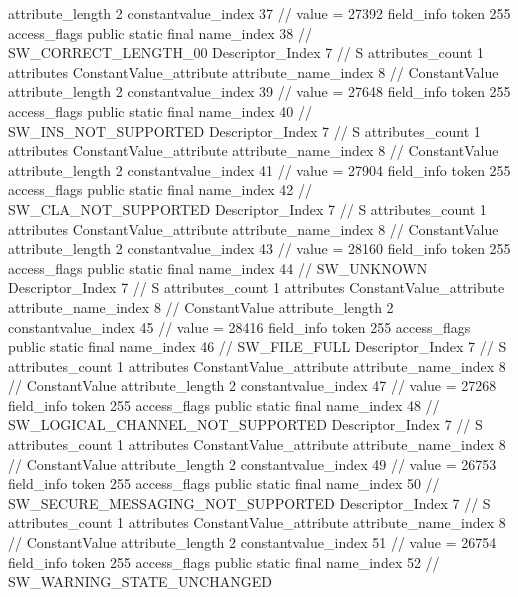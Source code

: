 {{{{{{{					attribute_length	2
					constantvalue_index	37		// value = 27392
				}
				}
			}
			field_info {
				token	255
				access_flags	public static final
				name_index	38		// SW_CORRECT_LENGTH_00
				Descriptor_Index	7		// S
				attributes_count	1
				attributes {
				ConstantValue_attribute {
					attribute_name_index	8		// ConstantValue
					attribute_length	2
					constantvalue_index	39		// value = 27648
				}
				}
			}
			field_info {
				token	255
				access_flags	public static final
				name_index	40		// SW_INS_NOT_SUPPORTED
				Descriptor_Index	7		// S
				attributes_count	1
				attributes {
				ConstantValue_attribute {
					attribute_name_index	8		// ConstantValue
					attribute_length	2
					constantvalue_index	41		// value = 27904
				}
				}
			}
			field_info {
				token	255
				access_flags	public static final
				name_index	42		// SW_CLA_NOT_SUPPORTED
				Descriptor_Index	7		// S
				attributes_count	1
				attributes {
				ConstantValue_attribute {
					attribute_name_index	8		// ConstantValue
					attribute_length	2
					constantvalue_index	43		// value = 28160
				}
				}
			}
			field_info {
				token	255
				access_flags	public static final
				name_index	44		// SW_UNKNOWN
				Descriptor_Index	7		// S
				attributes_count	1
				attributes {
				ConstantValue_attribute {
					attribute_name_index	8		// ConstantValue
					attribute_length	2
					constantvalue_index	45		// value = 28416
				}
				}
			}
			field_info {
				token	255
				access_flags	public static final
				name_index	46		// SW_FILE_FULL
				Descriptor_Index	7		// S
				attributes_count	1
				attributes {
				ConstantValue_attribute {
					attribute_name_index	8		// ConstantValue
					attribute_length	2
					constantvalue_index	47		// value = 27268
				}
				}
			}
			field_info {
				token	255
				access_flags	public static final
				name_index	48		// SW_LOGICAL_CHANNEL_NOT_SUPPORTED
				Descriptor_Index	7		// S
				attributes_count	1
				attributes {
				ConstantValue_attribute {
					attribute_name_index	8		// ConstantValue
					attribute_length	2
					constantvalue_index	49		// value = 26753
				}
				}
			}
			field_info {
				token	255
				access_flags	public static final
				name_index	50		// SW_SECURE_MESSAGING_NOT_SUPPORTED
				Descriptor_Index	7		// S
				attributes_count	1
				attributes {
				ConstantValue_attribute {
					attribute_name_index	8		// ConstantValue
					attribute_length	2
					constantvalue_index	51		// value = 26754
				}
				}
			}
			field_info {
				token	255
				access_flags	public static final
				name_index	52		// SW_WARNING_STATE_UNCHANGED
}}}}}
